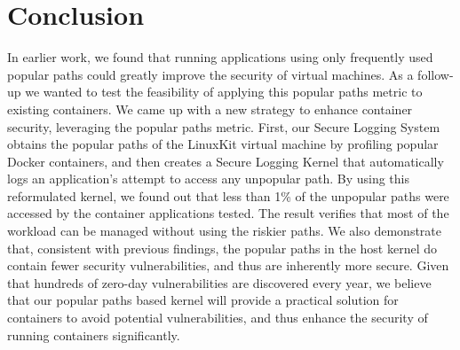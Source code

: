 \section{Conclusion}
\label{sec.conclusion}
In earlier work, we found that running applications using only frequently used popular paths could greatly improve the security of virtual machines. 
As a follow-up we wanted to test the feasibility of applying this popular paths metric to existing containers. 
We came up with a new strategy to enhance container security, leveraging the popular paths metric. 
First, our Secure Logging System obtains the popular paths of the LinuxKit virtual machine by profiling popular Docker containers, 
and then creates a Secure Logging Kernel that automatically logs an application’s attempt to access any unpopular path. 
By using this  reformulated kernel, we found out that less than 1\% of the unpopular paths were accessed by the container applications tested. 
The result verifies that most of the workload can be managed without using the riskier paths. 
We also demonstrate that, consistent with previous findings, the popular paths in the host kernel do contain fewer security vulnerabilities, and thus are inherently more secure. 
Given that hundreds of zero-day vulnerabilities are discovered every year, we believe that our popular paths based kernel will provide a practical solution for containers to avoid potential vulnerabilities, 
and thus enhance the security of running containers significantly. 